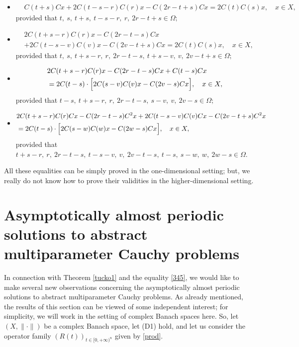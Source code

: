 \documentclass{amsart}
\theoremstyle{definition}
\theoremstyle{remark}
\numberwithin{equation}{section}
\begin{document}
\begin{itemize}
\item[(i)] \begin{align*} &
C (t+s) Cx+2C(t-s-r)C(r)x-C(2r-t+s)Cx=2C(t)C(s)x,\quad x\in X,
\end{align*}
provided that $t, \ s,\ t+s,\ t-s-r,\ r,\ 2r-t+s\in \Omega;$
\item[(ii)] \begin{align*} &
2C (t+s-r) C(r)x-C(2r-t-s)Cx
\\&+2C(t-s-v)C(v)x-C(2v-t+s)Cx=2C(t)C(s)x,\quad x\in X,
\end{align*}
provided that $t, \ s,\ t+s-r,\ r,\ 2r-t-s,\ t+s-v,\ v,\ 2v-t+s\in \Omega;$
\item[(iii)] \begin{align*} &
2C (t+s-r) C(r)x-C(2r-t-s)Cx+C(t-s)Cx
\\& =2C(t-s)\cdot \Bigl[ 2C(s-v)C(v)x-C(2v-s)Cx\Bigr],\quad x\in X,
\end{align*}
provided that $t-s, \ t+s-r,\ r,\ 2r-t-s,\ s-v,\ v,\ 2v-s\in \Omega;$
\item[(iv)] {\small \begin{align*} &
2C (t+s-r) C(r)Cx-C(2r-t-s)C^{2}x+ 2C (t-s-v) C(v)Cx-C(2v-t+s)C^{2}x
\\& =2C(t-s)\cdot \Bigl[ 2C(s-w)C(w)x-C(2w-s)Cx\Bigr],\quad x\in X,
\end{align*}}provided that $t+s-r,\ r,\ 2r-t-s,\ t-s-v,\ v,\ 2v-t-s,\ t-s,\ s-w,\ w,\ 2w-s\in \Omega .$
\end{itemize}

All these equalities can be simply proved in the one-dimensional setting; but, we really do not know how to prove their validities in the higher-dimensional setting.

\section{Asymptotically almost periodic solutions to abstract multiparameter Cauchy problems}\label{separ}

In connection with Theorem \ref{tucko1} and the equality \eqref{345}, we would like to make several new observations concerning the asymptotically almost periodic solutions to abstract multiparameter Cauchy problems. As already mentioned, the results of this section can be viewed of some independent interest; for simplicity, we will work in the setting of complex Banach spaces here. So, let $(X,\| \cdot \| )$ be a complex Banach space, let (D1) hold, and let us consider the operator family $(R(t))_{t\in [0,+\infty)^{n}}$ given by \eqref{prod}. \vspace{0.1cm}
\end{document}
